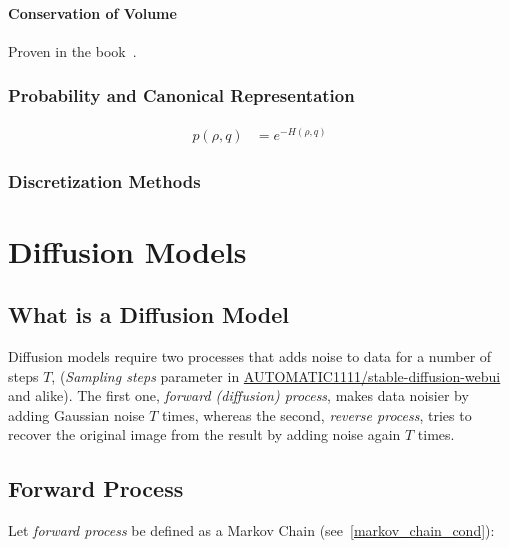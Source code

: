 \documentclass{book}
\numberwithin{equation}{subsection}
\begin{document}
\paragraph*{Conservation of Volume}
Proven in the book~\cite{neal_mcmc_2011}.
\subsubsection{Probability and Canonical Representation}
\begin{align}
    p(\rho, q) &= e^{-H(\rho, q)}
\end{align}
\subsubsection{Discretization Methods}
\section{Diffusion Models}
\subsection{What is a Diffusion Model}

Diffusion models require two processes that adds noise to data for a number of steps $T$, (\textit{Sampling steps} parameter in \href{https://github.com/AUTOMATIC1111/stable-diffusion-webui}{AUTOMATIC1111/stable-diffusion-webui} and alike). The first one, \textit{forward (diffusion) process}, makes data noisier by adding Gaussian noise $T$ times, whereas the second, \textit{reverse process}, tries to recover the original image from the result by adding noise again $T$ times.
\subsection{Forward Process}
Let \textit{forward process} be defined as a Markov Chain (see~\ref{markov_chain_cond}):
\end{document}
